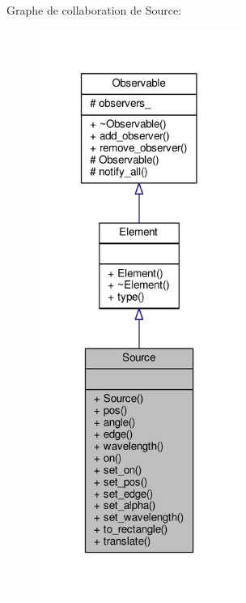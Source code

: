 Graphe de collaboration de Source\+:\nopagebreak
\begin{figure}[H]
\begin{center}
\leavevmode
\includegraphics[width=186pt]{d1/d35/classSource__coll__graph}
\end{center}
\end{figure}
